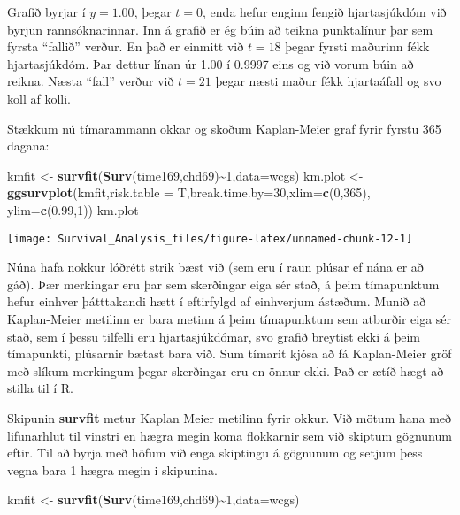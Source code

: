 \documentclass[
]{book}
\newenvironment{Shaded}{\begin{snugshade}}{\end{snugshade}}
\newcommand{\DataTypeTok}[1]{\textcolor[rgb]{0.13,0.29,0.53}{#1}}
\newcommand{\DecValTok}[1]{\textcolor[rgb]{0.00,0.00,0.81}{#1}}
\newcommand{\FloatTok}[1]{\textcolor[rgb]{0.00,0.00,0.81}{#1}}
\newcommand{\KeywordTok}[1]{\textcolor[rgb]{0.13,0.29,0.53}{\textbf{#1}}}
\newcommand{\NormalTok}[1]{#1}
\newcommand{\OperatorTok}[1]{\textcolor[rgb]{0.81,0.36,0.00}{\textbf{#1}}}
\newcommand{\StringTok}[1]{\textcolor[rgb]{0.31,0.60,0.02}{#1}}
\begin{document}
Grafið byrjar í \(y=1.00\), þegar \(t=0\), enda hefur enginn fengið hjartasjúkdóm við byrjun rannsóknarinnar. Inn á grafið er ég búin að teikna punktalínur þar sem fyrsta ``fallið'' verður. En það er einmitt við \(t=18\) þegar fyrsti maðurinn fékk hjartasjúkdóm. Þar dettur línan úr 1.00 í 0.9997 eins og við vorum búin að reikna. Næsta ``fall'' verður við \(t=21\) þegar næsti maður fékk hjartaáfall og svo koll af kolli.

Stækkum nú tímarammann okkar og skoðum Kaplan-Meier graf fyrir fyrstu 365 dagana:

\begin{Shaded}
\begin{Highlighting}[]
\NormalTok{kmfit <{-}}\StringTok{ }\KeywordTok{survfit}\NormalTok{(}\KeywordTok{Surv}\NormalTok{(time169,chd69)}\OperatorTok{\textasciitilde{}}\DecValTok{1}\NormalTok{,}\DataTypeTok{data=}\NormalTok{wcgs)}
\NormalTok{km.plot <{-}}\StringTok{ }\KeywordTok{ggsurvplot}\NormalTok{(kmfit,}\DataTypeTok{risk.table =}\NormalTok{ T,}\DataTypeTok{break.time.by=}\DecValTok{30}\NormalTok{,}\DataTypeTok{xlim=}\KeywordTok{c}\NormalTok{(}\DecValTok{0}\NormalTok{,}\DecValTok{365}\NormalTok{),}
                      \DataTypeTok{ylim=}\KeywordTok{c}\NormalTok{(}\FloatTok{0.99}\NormalTok{,}\DecValTok{1}\NormalTok{)) }
\NormalTok{km.plot }
\end{Highlighting}
\end{Shaded}

\texttt{[image: Survival\_Analysis\_files/figure-latex/unnamed-chunk-12-1]}

Núna hafa nokkur lóðrétt strik bæst við (sem eru í raun plúsar ef nána er að gáð). Þær merkingar eru þar sem skerðingar eiga sér stað, á þeim tímapunktum hefur einhver þátttakandi hætt í eftirfylgd af einhverjum ástæðum. Munið að Kaplan-Meier metilinn er bara metinn á þeim tímapunktum sem atburðir eiga sér stað, sem í þessu tilfelli eru hjartasjúkdómar, svo grafið breytist ekki á þeim tímapunkti, plúsarnir bætast bara við. Sum tímarit kjósa að fá Kaplan-Meier gröf með slíkum merkingum þegar skerðingar eru en önnur ekki. Það er ætíð hægt að stilla til í R.

Skipunin \textbf{survfit} metur Kaplan Meier metilinn fyrir okkur. Við mötum hana með lifunarhlut til vinstri en hægra megin koma flokkarnir sem við skiptum gögnunum eftir. Til að byrja með höfum við enga skiptingu á gögnunum og setjum þess vegna bara 1 hægra megin i skipunina.

\begin{Shaded}
\begin{Highlighting}[]
\NormalTok{kmfit <{-}}\StringTok{ }\KeywordTok{survfit}\NormalTok{(}\KeywordTok{Surv}\NormalTok{(time169,chd69)}\OperatorTok{\textasciitilde{}}\DecValTok{1}\NormalTok{,}\DataTypeTok{data=}\NormalTok{wcgs)}
\end{Highlighting}
\end{Shaded}
\end{document}
